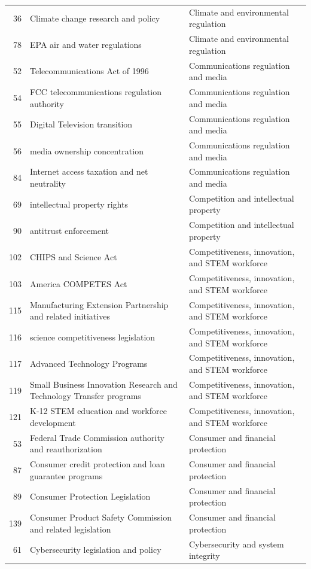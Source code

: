 \begin{longtable}{rll}
36 & Climate change research and policy & Climate and environmental regulation \\
78 & EPA air and water regulations & Climate and environmental regulation \\
52 & Telecommunications Act of 1996 & Communications regulation and media \\
54 & FCC telecommunications regulation authority & Communications regulation and media \\
55 & Digital Television transition & Communications regulation and media \\
56 & media ownership concentration & Communications regulation and media \\
84 & Internet access taxation and net neutrality & Communications regulation and media \\
69 & intellectual property rights & Competition and intellectual property \\
90 & antitrust enforcement & Competition and intellectual property \\
102 & CHIPS and Science Act & Competitiveness, innovation, and STEM workforce \\
103 & America COMPETES Act & Competitiveness, innovation, and STEM workforce \\
115 & Manufacturing Extension Partnership and related initiatives & Competitiveness, innovation, and STEM workforce \\
116 & science competitiveness legislation & Competitiveness, innovation, and STEM workforce \\
117 & Advanced Technology Programs & Competitiveness, innovation, and STEM workforce \\
119 & Small Business Innovation Research and Technology Transfer programs & Competitiveness, innovation, and STEM workforce \\
121 & K-12 STEM education and workforce development & Competitiveness, innovation, and STEM workforce \\
53 & Federal Trade Commission authority and reauthorization & Consumer and financial protection \\
87 & Consumer credit protection and loan guarantee programs & Consumer and financial protection \\
89 & Consumer Protection Legislation & Consumer and financial protection \\
139 & Consumer Product Safety Commission and related legislation & Consumer and financial protection \\
61 & Cybersecurity legislation and policy & Cybersecurity and system integrity \\

\end{longtable}
